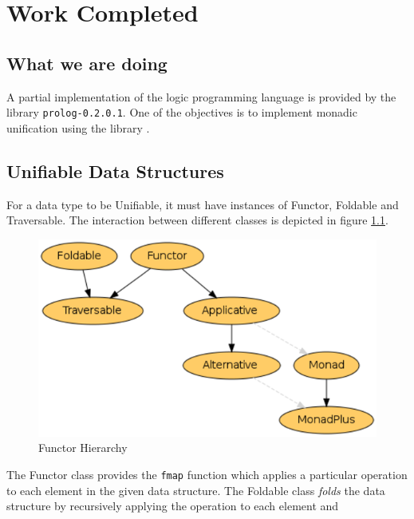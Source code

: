 \documentclass[proposal.tex]{subfiles}
\begin{document}
\chapter{Work Completed}\label{chap:workCompleted}
\section{What we are doing}
A partial implementation of the logic programming language  is provided by the library \texttt{prolog-0.2.0.1}. One of the 
objectives is to implement monadic unification using the library \cite{unification-fd-lib}. 


\section{Unifiable Data Structures}
For a data type to be Unifiable, it must have instances of Functor, Foldable and Traversable. The interaction between different classes is depicted in figure 
\ref{fig:Functor Hierarchy}.

\begin{figure}[th]
\centering
\includegraphics[scale = 0.7]{FunctorHierarchy.png}
\caption{Functor Hierarchy \cite{website:foldablenadtraversable}}
\label{fig:Functor Hierarchy}
\end{figure}  

The Functor class provides the \texttt{fmap} function which applies a particular operation to each element in the given data structure. The Foldable class \textit{folds} the data structure by recursively applying the operation to each element and 
\end{document}
